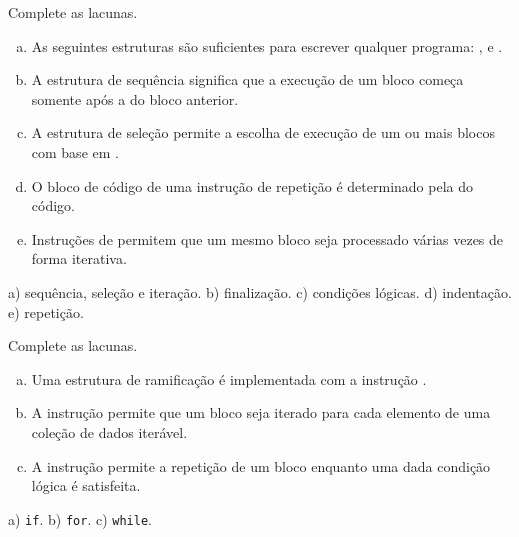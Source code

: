 
\begin{exer}
  Complete as lacunas.
  \begin{enumerate}[a)]
    \item As seguintes estruturas são suficientes para escrever qualquer programa: \underline{\phantom{sequência}}, \underline{\phantom{seleção}} e \underline{\phantom{iteração}}.
    \item A estrutura de sequência significa que a execução de um bloco começa somente após a \underline{\phantom{finalização}} do bloco anterior.
    \item A estrutura de seleção permite a escolha de execução de um ou mais blocos com base em \underline{\phantom{condições lógicas}}.
    \item O bloco de código de uma instrução de repetição é determinado pela \underline{\phantom{indentação}} do código.
    \item Instruções de \underline{\phantom{repetição}} permitem que um mesmo bloco seja processado várias vezes de forma iterativa.
  \end{enumerate}
\end{exer}
\begin{resp}
  a) sequência, seleção e iteração. b) finalização. c) condições lógicas. d) indentação. e) repetição.
\end{resp}

\begin{exer}
  Complete as lacunas.
  \begin{enumerate}[a)]
    \item Uma estrutura de ramificação é implementada com a instrução \underline{}.
    \item A instrução \underline{} permite que um bloco seja iterado para cada elemento de uma coleção de dados iterável.
    \item A instrução \underline{} permite a repetição de um bloco enquanto uma dada condição lógica é satisfeita.
  \end{enumerate}
\end{exer}
\begin{resp}
  a) \texttt{if}. b) \texttt{for}. c) \texttt{while}.
\end{resp}


